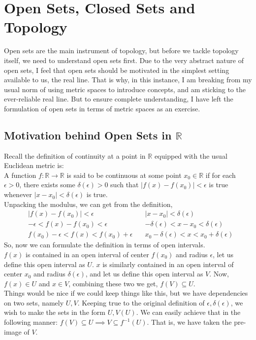 \section{Open Sets, Closed Sets and Topology}
Open sets are the main instrument of topology, but before we tackle topology itself, we need to understand open sets first. Due to the very abstract nature of open sets, I feel that open sets should be motivated in the simplest setting available to us, the real line. That is why, in this instance, I am breaking from my usual norm of using metric spaces to introduce concepts, and am sticking to the ever-reliable real line. But to ensure complete understanding, I have left the formulation of open sets in terms of metric spaces as an exercise.
\subsection{Motivation behind Open Sets in \texorpdfstring{$\mathbb{R}$}{R}}
Recall the definition of continuity at a point in $\mathbb{R}$ equipped with the usual Euclidean metric is:\\
A function $f:\mathbb{R}\rightarrow\mathbb{R}$ is said to be continuous at some point $x_0\in\mathbb{R}$ if for each $\epsilon>0$, there exists some $\delta(\epsilon)>0$ such that $|f(x)-f(x_0)|<\epsilon$ is true whenever $|x-x_0|<\delta(\epsilon)$ is true.\\
Unpacking the modulus, we can get from the definition,
\begin{align*}
    &|f(x)-f(x_0)|<\epsilon\quad &|x-x_0|<\delta(\epsilon)\\
    &-\epsilon<f(x)-f(x_0)<\epsilon\quad & -\delta(\epsilon)<x-x_0<\delta(\epsilon)\\
    &\boxed{f(x_0)-\epsilon<f(x)<f(x_0)+\epsilon}\quad & \boxed{x_0-\delta(\epsilon)<x<x_0+\delta(\epsilon)}
\end{align*}
So, now we can formulate the definition in terms of open intervals.\\
$f(x)$ is contained in an open interval of center $f(x_0)$ and radius $\epsilon$, let us define this open interval as $U$. $x$ is similarly contained in an open interval of center $x_0$ and radius $\delta(\epsilon)$, and let us define this open interval as $V$. Now, $f(x)\in U$ and $x\in V$, combining these two we get, $\boxed{f(V)\subseteq U}$.\\
Things would be nice if we could keep things like this, but we have dependencies on two sets, namely $U,  V$. Keeping true to the original definition of $\epsilon,\delta(\epsilon)$, we wish to make the sets in the form $U, V(U)$. We can easily achieve that in the following manner: $f(V)\subseteq U\implies\boxed{ V\subseteq f^{-1}(U)}$. That is, we have taken the pre-image of $V$.\\
